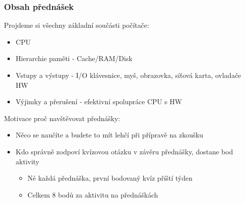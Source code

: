 \documentclass{beamer}
\begin{document}
\begin{frame}
\frametitle{Obsah přednášek}
Projdeme si všechny základní součásti počítače:
\begin{itemize}
\item CPU
\item Hierarchie paměti - Cache/RAM/Disk
\item Vstupy a výstupy - I/O klávesnice, myš, obrazovka, síťová karta, ovladače HW
\item Výjimky a přerušení - efektivní spolupráce CPU s HW
\end{itemize}

Motivace proč navštěvovat přednášky:
\begin{itemize}
\item Něco se naučíte a budete to mít lehčí při přípravě na zkoušku
\item Kdo správně zodpoví kvízovou otázku v závěru přednášky, dostane bod aktivity
  \begin{itemize}
  \item Né každá přednáška, první bodovaný kvíz příští týden 
  \item Celkem 8 bodů za aktivitu na přednáškách
  \end{itemize}
\end{itemize}

\end{frame}
\end{document}
